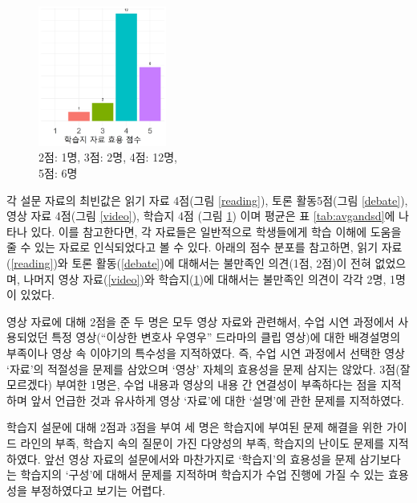 \documentclass[10pt, a4paper, chapter]{oblivoir}
\begin{document}
\begin{figure}
\begin{minipage}{0.45\linewidth}
    \end{minipage}
    \hspace{0.05\linewidth}
    \begin{minipage}{0.45\linewidth}        
        \centering
        \includegraphics[height = 4.6cm, width = 0.75\linewidth]{material.png}
        \caption{2점: 1명, 3점: 2명, 4점: 12명,\\5점: 6명}
        \label{material}
    \end{minipage}
    
\end{figure}
\noindent
각 설문 자료의 최빈값은 읽기 자료 4점(그림 \ref{reading}), 토론 활동5점(그림 \ref{debate}), 영상 자료 4점(그림 \ref{video}), 학습지 4점 (그림 \ref{material})
이며 평균은 표 \ref{tab:avgandsd}에 나타나 있다. 이를 참고한다면, 각 자료들은 일반적으로 학생들에게 학습 이해에 도움을 줄 수 있는 자료로 인식되었다고 볼 수 있다.
아래의 점수 분포를 참고하면, 읽기 자료(\ref{reading})와 토론 활동(\ref{debate})에 대해서는 불만족인 의견(1점, 2점)이 전혀 없었으며, 나머지 영상 자료(\ref{video})와 학습지(\ref{material})에 대해서는 불만족인 의견이 각각 2명, 1명이 있었다.

영상 자료에 대해 2점을 준 두 명은 모두 영상 자료와 관련해서, 
수업 시연 과정에서 사용되었던 특정 영상(``이상한 변호사 우영우'' 드라마의 클립 영상)에 대한 배경설명의 부족이나 영상 속 이야기의 특수성을 지적하였다. 즉, 수업 시연 과정에서 선택한 
영상 `자료'의 적절성을 문제를 삼았으며 `영상' 자체의 효용성을 문제 삼지는 않았다. 3점(잘 모르겠다) 부여한 1명은, 수업 내용과 영상의 내용 간 연결성이 부족하다는 점을 지적하며 
앞서 언급한 것과 유사하게 영상 `자료'에 대한 `설명'에 관한 문제를 지적하였다.

학습지 설문에 대해 2점과 3점을 부여 세 명은 학습지에 부여된 문제 해결을 위한 가이드 라인의 부족,
학습지 속의 질문이 가진 다양성의 부족, 학습지의 난이도 문제를 지적하였다. 앞선 영상 자료의 
설문에서와 마찬가지로 `학습지'의 효용성을 문제 삼기보다는 학습지의 `구성'에 대해서 문제를 지적하며 학습지가 수업 진행에 가질 수 있는 효용성을 부정하였다고 보기는 어렵다. 
\end{document}
